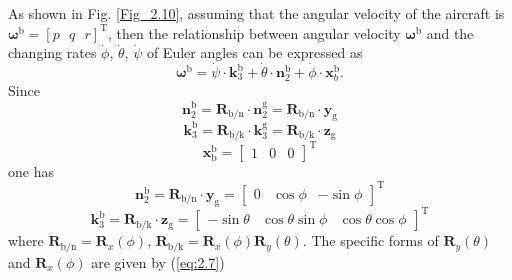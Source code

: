 As shown in Fig. \ref{Fig_2.10}, assuming that the angular velocity
of the aircraft is ${{\boldsymbol{\omega}}^{\text{b}}}={{\left[p\text{ }q\text{ }r\right]}^{\text{T}}}$,
then the relationship between angular velocity ${\boldsymbol{\omega}^{\text{b}}}$
and the changing rates $\dot{\phi}$, $\dot{\theta}$, $\dot{\psi}$
of Euler angles can be expressed as \cite{ducard2009fault}
\begin{equation}
{{\boldsymbol{\omega}}^{\text{b}}}=\dot{\psi}\cdot\mathbf{k}_{3}^{\text{b}}+\dot{\theta}\cdot\mathbf{n}_{2}^{\text{b}}+\dot{\phi}\cdot\mathbf{x}_{b}^{\text{b}}.\label{eq:2.40}
\end{equation}
Since 
\begin{equation}
\mathbf{n}_{2}^{\text{b}}={{\mathbf{R}}_{\text{{b}/{n}}}}\cdot\mathbf{n}_{2}^{\text{g}}={{\mathbf{R}}_{\text{{b}/{n}}}}\cdot{{\mathbf{y}}_{\text{g}}}\label{eq:2.41}
\end{equation}
\begin{equation}
\mathbf{k}_{3}^{\text{b}}={{\mathbf{R}}_{\text{{b}/{k}}}}\cdot\mathbf{k}_{3}^{\text{g}}={\mathbf{R}_{\text{{b}/{k}}}}\cdot{{\mathbf{z}}_{\text{g}}}\label{eq:2.42}
\end{equation}
\begin{equation}
\mathbf{x}_{\text{b}}^{\text{b}}=\left[\begin{array}{ccc}
1 & 0 & 0\end{array}\right]^{\text{T}}\label{eq:2.43}
\end{equation}
one has 
\begin{equation}
\mathbf{n}_{2}^{\text{b}}={{\mathbf{R}}_{\text{{b}/{n}}}}\cdot{{\mathbf{y}}_{\text{g}}}={{\left[\begin{array}{ccc}
		0 & \cos\phi & -\sin\phi\end{array}\right]}^{\text{T}}}\label{eq:2.44}
\end{equation}
\begin{equation}
\mathbf{k}_{3}^{\text{b}}={{\mathbf{R}}_{\text{{b}/{k}}}}\cdot{{\mathbf{z}}_{\text{g}}}={{\left[\begin{array}{ccc}
		-\sin\theta & \cos\theta\sin\phi & \cos\theta\cos\phi\end{array}\right]}^{\text{T}}}\label{2.45}
\end{equation}
where ${{\mathbf{R}}_{\text{{b}/{n}}}}={{\mathbf{R}}_{x}}\left(\phi\right)$,
${{\mathbf{R}}_{\text{{b}/{k}}}}={{\mathbf{R}}_{x}}\left(\phi\right){{\mathbf{R}}_{y}}\left(\theta\right)$.
The specific forms of ${{\mathbf{R}}_{y}}\left(\theta\right)$ and
${{\mathbf{R}}_{x}}\left(\phi\right)$ are given by (\ref{eq:2.7})
